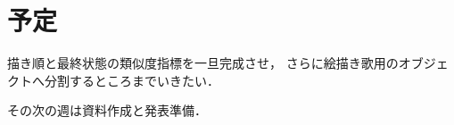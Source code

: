 \documentclass[onecolumn]{ujarticle}   %
\begin{document}
\section{予定}
描き順と最終状態の類似度指標を一旦完成させ，
さらに絵描き歌用のオブジェクトへ分割するところまでいきたい．

その次の週は資料作成と発表準備．


% 
% 
\end{document}

